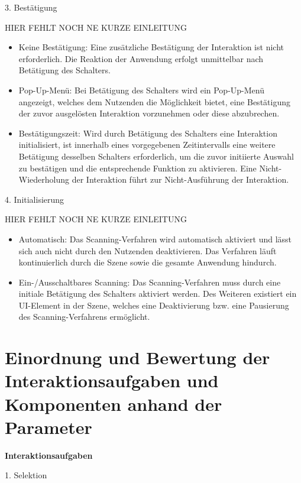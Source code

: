 3. Bestätigung 

HIER FEHLT NOCH NE KURZE EINLEITUNG

\begin{itemize}
    \item Keine Bestätigung: Eine zusätzliche Bestätigung der Interaktion ist nicht erforderlich. Die Reaktion der Anwendung erfolgt unmittelbar nach Betätigung des Schalters.
    \item Pop-Up-Menü: Bei Betätigung des Schalters wird ein Pop-Up-Menü angezeigt, welches dem Nutzenden die Möglichkeit bietet, eine Bestätigung der zuvor ausgelösten Interaktion vorzunehmen oder diese abzubrechen. 
    \item Bestätigungszeit: Wird durch Betätigung des Schalters eine Interaktion initialisiert, ist innerhalb eines vorgegebenen Zeitintervalls eine weitere Betätigung desselben Schalters erforderlich, um die zuvor initiierte Auswahl zu bestätigen und die entsprechende Funktion zu aktivieren. Eine Nicht-Wiederholung der Interaktion führt zur Nicht-Ausführung der Interaktion. 
\end{itemize}

4. Initialisierung 

HIER FEHLT NOCH NE KURZE EINLEITUNG

\begin{itemize}
    \item Automatisch: Das Scanning-Verfahren wird automatisch aktiviert und lässt sich auch nicht durch den Nutzenden deaktivieren. Das Verfahren läuft kontinuierlich durch die Szene sowie die gesamte Anwendung hindurch.
    \item Ein-/Ausschaltbares Scanning: Das Scanning-Verfahren muss durch eine initiale Betätigung des Schalters aktiviert werden. Des Weiteren existiert ein UI-Element in der Szene, welches eine Deaktivierung bzw. eine Pausierung des Scanning-Verfahrens ermöglicht. 
\end{itemize}

\section{Einordnung und Bewertung der Interaktionsaufgaben und Komponenten anhand der Parameter}

{\normalfont \bfseries Interaktionsaufgaben}  

1. Selektion

